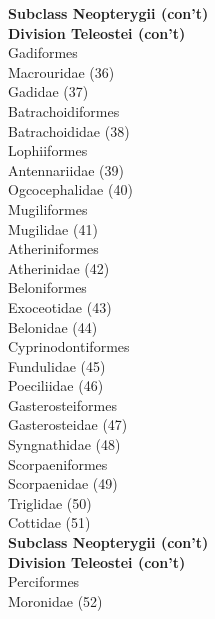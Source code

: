 \documentclass[12pt, hidelinks]{exam}
\newcommand{\onedent}{\hspace*{1em}}
\newcommand{\twodent}{\hspace*{2em}}
\begin{document}
\begin{multicols}{2}
\textbf{Subclass Neopterygii (con't)}\\
\hspace*{0.67em}\textbf{Division Teleostei (con't)}\\
\onedent Gadiformes\\
\twodent Macrouridae (36)\\
\twodent Gadidae (37)\\
\onedent Batrachoidiformes\\
\twodent Batrachoididae (38)\\
\onedent Lophiiformes\\
\twodent Antennariidae (39)\\
\twodent Ogcocephalidae (40)\\
\onedent Mugiliformes\\
\twodent Mugilidae (41)\\
\onedent Atheriniformes\\
\twodent Atherinidae (42)\\
\onedent Beloniformes\\
\twodent Exoceotidae (43)\\
\twodent Belonidae (44)\\
\onedent Cyprinodontiformes\\
\twodent Fundulidae (45)\\
\twodent Poeciliidae (46)\\
\onedent Gasterosteiformes\\
\twodent Gasterosteidae (47)\\
\twodent Syngnathidae (48)\\
\onedent Scorpaeniformes\\
\twodent Scorpaenidae (49)\\
\twodent Triglidae (50)\\
\twodent Cottidae (51)\\
\textbf{Subclass Neopterygii (con't)}\\
\hspace*{0.67em}\textbf{Division Teleostei (con't)}\\
\onedent Perciformes\\
\twodent Moronidae (52)\\

\end{multicols}
\end{document}
